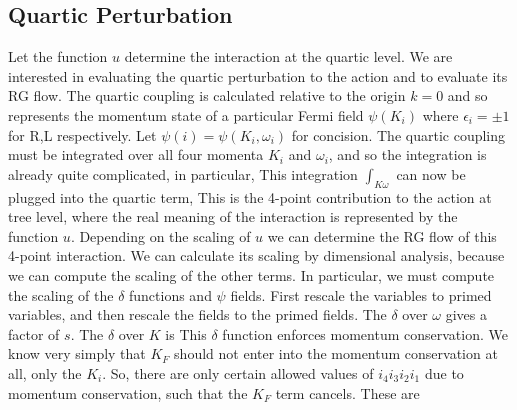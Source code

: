\documentclass{article}
\begin{document}
\subsection{Quartic Perturbation}
Let the function $u$ determine the interaction at the quartic level. We are interested in evaluating the quartic perturbation to the action and to evaluate its RG flow. The quartic coupling is calculated relative to the origin $k=0$ and so
represents the momentum state of a particular Fermi field $\psi(K_i)$ where $\epsilon_i=\pm 1$ for R,L respectively. Let $\psi(i)=\psi(K_i,\omega_i)$ for concision. The quartic coupling must be integrated over all four momenta $K_i$ and $\omega_i$, and so the integration is already quite complicated, in particular,
This integration $\int_{K\omega}$ can now be plugged into the quartic term,
This is the 4-point contribution to the action at tree level, where the real meaning of the interaction is represented by the function $u$. Depending on the scaling of $u$ we can determine the RG flow of this 4-point interaction. We can calculate its scaling by dimensional analysis, because we can compute the scaling of the other terms. In particular, we must compute the scaling of the $\delta$ functions and $\psi$ fields. First rescale the variables to primed variables, and then rescale the fields to the primed fields.
The $\delta$ over $\omega$ gives a factor of $s$. The $\delta$ over $K$ is 
This $\delta$ function enforces momentum conservation. We know very simply that $K_F$ should not enter into the momentum conservation at all, only the $K_i$. So, there are only certain allowed values of $i_4i_3i_2i_1$ due to momentum conservation, such that the $K_F$ term cancels. These are
\end{document}
